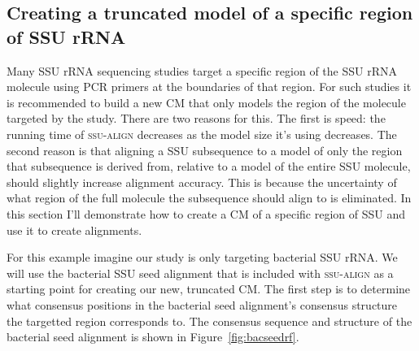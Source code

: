 \subsection{Creating a truncated model of a specific region of SSU rRNA}

Many SSU rRNA sequencing studies target a specific region of the SSU
rRNA molecule using PCR primers at the boundaries of that region. For
such studies it is recommended to build a new CM that only models the
region of the molecule targeted by the study. There are two reasons
for this. The first is speed: the running time of \textsc{ssu-align}
decreases as the model size it's using decreases. The second reason is
that aligning a SSU subsequence to a model of only the region that
subsequence is derived from, relative to a model of the entire SSU
molecule, should slightly increase alignment accuracy. This is because
the uncertainty of what region of the full molecule the subsequence
should align to is eliminated. In this section I'll demonstrate how to
create a CM of a specific region of SSU and use it to create
alignments. 

For this example imagine our study is only targeting bacterial SSU
rRNA. We will use the bacterial SSU seed alignment that is included
with \textsc{ssu-align} as a starting point for creating our new,
truncated CM. The first step is to determine what consensus positions
in the bacterial seed alignment's consensus structure the targetted
region corresponds to. The consensus sequence and structure of the
bacterial seed alignment is shown in Figure~\ref{fig:bacseedrf}.

